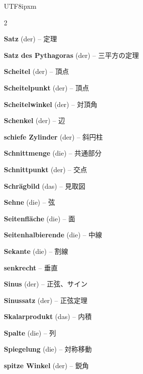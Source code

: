 \begin{CJK}{UTF8}{ipxm}
\begin{multicols}{2}
\par\nopagebreak
\textbf{Satz} (der) -- 定理\dotfill\hyperref[e:347]{\pageref*{e:347}}\par
\textbf{Satz des Pythagoras} (der) -- 三平方の定理\dotfill\hyperref[e:190]{\pageref*{e:190}}\par
\textbf{Scheitel} (der) -- 頂点\dotfill\hyperref[e:154]{\pageref*{e:154}}\par
\textbf{Scheitelpunkt} (der) -- 頂点\dotfill\hyperref[e:129]{\pageref*{e:129}}\par
\textbf{Scheitelwinkel} (der) -- 対頂角\dotfill\hyperref[e:166]{\pageref*{e:166}}\par
\textbf{Schenkel} (der) -- 辺\dotfill\hyperref[e:155]{\pageref*{e:155}}\par
\textbf{schiefe Zylinder} (der) -- 斜円柱\dotfill\hyperref[e:238]{\pageref*{e:238}}\par
\textbf{Schnittmenge} (die) -- 共通部分\dotfill\hyperref[e:100]{\pageref*{e:100}}\par
\textbf{Schnittpunkt} (der) -- 交点\dotfill\hyperref[e:123]{\pageref*{e:123}}\par
\textbf{Schrägbild} (das) -- 見取図\dotfill\hyperref[e:254]{\pageref*{e:254}}\par
\textbf{Sehne} (die) -- 弦\dotfill\hyperref[e:218]{\pageref*{e:218}}\par
\textbf{Seitenfläche} (die) -- 面\dotfill\hyperref[e:247]{\pageref*{e:247}}\par
\textbf{Seitenhalbierende} (die) -- 中線\dotfill\hyperref[e:192]{\pageref*{e:192}}\par
\textbf{Sekante} (die) -- 割線\dotfill\hyperref[e:219]{\pageref*{e:219}}\par
\textbf{senkrecht} -- 垂直\dotfill\hyperref[e:151]{\pageref*{e:151}}\par
\textbf{Sinus} (der) -- 正弦、サイン\dotfill\hyperref[e:132]{\pageref*{e:132}}\par
\textbf{Sinussatz} (der) -- 正弦定理\dotfill\hyperref[e:140]{\pageref*{e:140}}\par
\textbf{Skalarprodukt} (das) -- 内積\dotfill\hyperref[e:306]{\pageref*{e:306}}\par
\textbf{Spalte} (die) -- 列\dotfill\hyperref[e:323]{\pageref*{e:323}}\par
\textbf{Spiegelung} (die) -- 対称移動\dotfill\hyperref[e:172]{\pageref*{e:172}}\par
\textbf{spitze Winkel} (der) -- 鋭角\dotfill\hyperref[e:157]{\pageref*{e:157}}\par

\end{multicols}
\end{CJK}

